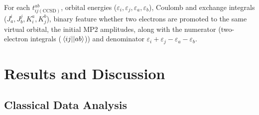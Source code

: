\documentclass[journal=jacsat,manuscript=article]{achemso}
\begin{document}
For each $t^{ab}_{ij(\text{CCSD})}$, orbital energies ($\varepsilon_{i},\varepsilon_{j},\varepsilon_{a},\varepsilon_{b}$), Coulomb and exchange integrals ($J^{i}_{a},J^{j}_{b},K^{a}_{i},K^{b}_{j}$), binary feature whether two electrons are promoted to the same virtual orbital, the initial MP2 amplitudes, along with the numerator (two-electron integrals ($\mel{ij}{}{ab}$)) and denominator $\varepsilon_{i}+\varepsilon_{j}-\varepsilon_{a}-\varepsilon_{b}$.










\section{Results and Discussion}
\label{section:results_and_discussion}



\subsection{Classical Data Analysis}


 
\end{document}
